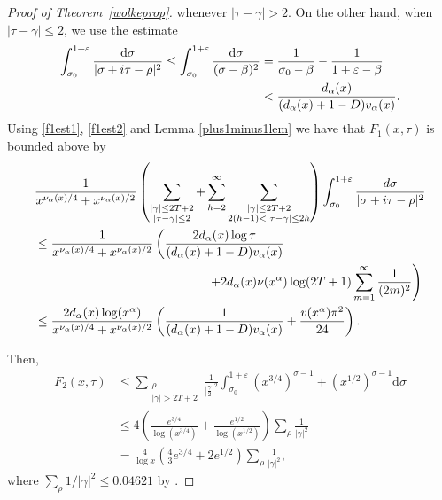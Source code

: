 \documentclass[reqno]{amsart}
\numberwithin{equation}{section}
\theoremstyle{remark}
\begin{document}
\begin{proof}[Proof of Theorem~\ref{wolkeprop}]
whenever $|\tau-\gamma|>2$. On the other hand, when $|\tau-\gamma|\leq 2$, we use the estimate
\begin{align}\label{f1est2}
    \int_{\sigma_0}^{1+\varepsilon}\frac{\mathrm{d}\sigma}{|\sigma+i\tau-\rho|^2}\leq\int_{\sigma_0}^{1+\varepsilon}\frac{\mathrm{d}\sigma}{(\sigma-\beta)^2}&=\frac{1}{\sigma_0-\beta}-\frac{1}{1+\varepsilon-\beta}\notag\\
    &<\frac{d_{\alpha}(x)}{(d_{\alpha}(x)+1-D)v_{\alpha}(x)}.  
\end{align}
Using \eqref{f1est1}, \eqref{f1est2} and Lemma \ref{plus1minus1lem} we have that $F_1(x,\tau)$ is bounded above by
\begin{align}\label{toughterm2}
    &\frac{1}{x^{\nu_{\alpha}(x)/4}+x^{\nu_{\alpha}(x)/2}}\left(\sum_{\substack{|\gamma|\leq 2T+2\\|\tau-\gamma|\leq 2}}+\sum_{h=2}^\infty\sum_{\substack{|\gamma|\leq 2T+2\\2(h-1)<|\tau-\gamma|\leq 2h}}\right)\int_{\sigma_0}^{1+\varepsilon}\frac{d\sigma}{|\sigma+i\tau-\rho|^2}\notag\\
    &\leq\frac{1}{x^{\nu_{\alpha}(x)/4}+x^{\nu_{\alpha}(x)/2}}\left(\frac{2d_{\alpha}(x)\log\tau}{(d_{\alpha}(x)+1-D)v_{\alpha}(x)}\right.\notag\\
    &\qquad\qquad\qquad\qquad\qquad\qquad\qquad\left.+2d_{\alpha}(x)\nu(x^{\alpha})\log(2T+1)\sum_{m=1}^\infty\frac{1}{(2m)^2}\right)\notag\\
    &\leq\frac{2d_{\alpha}(x)\log(x^\alpha)}{x^{\nu_{\alpha}(x)/4}+x^{\nu_{\alpha}(x)/2}}\left(\frac{1}{(d_{\alpha}(x)+1-D)v_{\alpha}(x)}+\frac{v(x^\alpha)\pi^2}{24}\right).
\end{align} 

Then,
\begin{align*}
    F_2(x,\tau)&\leq\sum_{\substack{\rho\\|\gamma|>2T+2}}\frac{1}{\left|\frac{\gamma}{2}\right|^2}\int_{\sigma_0}^{1+\varepsilon}(x^{3/4})^{\sigma-1}+(x^{1/2})^{\sigma-1}\mathrm{d}\sigma\\
    &\leq 4\left(\frac{e^{3/4}}{\log(x^{3/4})}+\frac{e^{1/2}}{\log(x^{1/2})}\right)\sum_{\rho}\frac{1}{|\gamma|^2}\\
    &=\frac{4}{\log x}\left(\frac{4}{3}e^{3/4}+2e^{1/2}\right)\sum_{\rho}\frac{1}{|\gamma|^2},
\end{align*}
where $\sum_{\rho} 1/|\gamma|^2\leq 0.04621$ by \cite[Example 1]{brent2021accurate}.


\end{proof}
\end{document}
